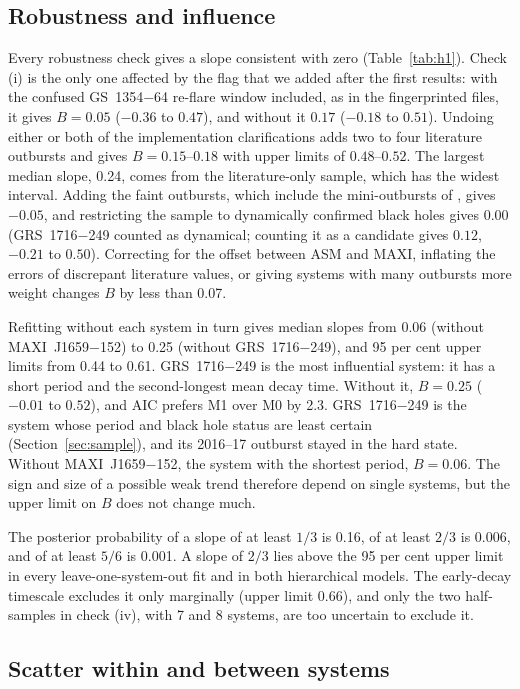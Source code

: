 \documentclass[fleqn,usenatbib]{mnras}
\begin{document}
\subsection{Robustness and influence}
\label{sec:robust}

Every robustness check gives a slope consistent with zero (Table~\ref{tab:h1}). Check (i) is the only one affected by the flag that we added after the first results: with the confused GS~1354$-$64 re-flare window included, as in the fingerprinted files, it gives $B=0.05$ ($-0.36$ to $0.47$), and without it $0.17$ ($-0.18$ to $0.51$). Undoing either or both of the implementation clarifications adds two to four literature outbursts and gives $B=0.15$--$0.18$ with upper limits of $0.48$--$0.52$. The largest median slope, 0.24, comes from the literature-only sample, which has the widest interval. Adding the faint outbursts, which include the mini-outbursts of \citet{Saraswati2025}, gives $-0.05$, and restricting the sample to dynamically confirmed black holes gives $0.00$ (GRS~1716$-$249 counted as dynamical; counting it as a candidate gives $0.12$, $-0.21$ to $0.50$). Correcting for the offset between ASM and MAXI, inflating the errors of discrepant literature values, or giving systems with many outbursts more weight changes $B$ by less than 0.07.

Refitting without each system in turn gives median slopes from 0.06 (without MAXI~J1659$-$152) to 0.25 (without GRS~1716$-$249), and 95 per cent upper limits from 0.44 to 0.61. GRS~1716$-$249 is the most influential system: it has a short period and the second-longest mean decay time. Without it, $B=0.25$ ($-0.01$ to $0.52$), and AIC prefers M1 over M0 by 2.3. GRS~1716$-$249 is the system whose period and black hole status are least certain (Section~\ref{sec:sample}), and its 2016--17 outburst stayed in the hard state. Without MAXI~J1659$-$152, the system with the shortest period, $B=0.06$. The sign and size of a possible weak trend therefore depend on single systems, but the upper limit on $B$ does not change much.

The posterior probability of a slope of at least $1/3$ is 0.16, of at least $2/3$ is 0.006, and of at least $5/6$ is 0.001. A slope of $2/3$ lies above the 95 per cent upper limit in every leave-one-system-out fit and in both hierarchical models. The early-decay timescale excludes it only marginally (upper limit 0.66), and only the two half-samples in check (iv), with 7 and 8 systems, are too uncertain to exclude it.

\subsection{Scatter within and between systems}
\label{sec:hier}
\end{document}
